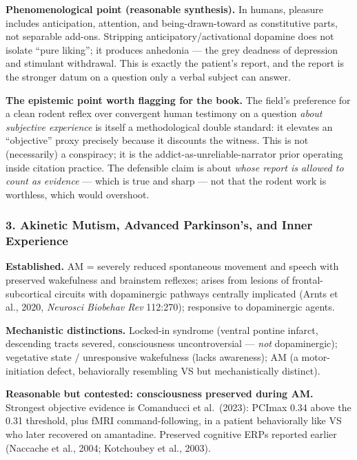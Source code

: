 \textbf{Phenomenological point (reasonable synthesis).} In humans, pleasure includes anticipation, attention, and being-drawn-toward as constitutive parts, not separable add-ons. Stripping anticipatory/activational dopamine does not isolate ``pure liking''; it produces anhedonia --- the grey deadness of depression and stimulant withdrawal. This is exactly the patient's report, and the report is the stronger datum on a question only a verbal subject can answer.

\textbf{The epistemic point worth flagging for the book.} The field's preference for a clean rodent reflex over convergent human testimony on a question \emph{about subjective experience} is itself a methodological double standard: it elevates an ``objective'' proxy precisely because it discounts the witness. This is not (necessarily) a conspiracy; it is the addict-as-unreliable-narrator prior operating inside citation practice. The defensible claim is about \emph{whose report is allowed to count as evidence} --- which is true and sharp --- not that the rodent work is worthless, which would overshoot.

\subsubsection{3. Akinetic Mutism, Advanced Parkinson's, and Inner Experience}\label{02_dopamine_action-akinetic-mutism-advanced-parkinsons-and-inner-experience}

\textbf{Established.} AM = severely reduced spontaneous movement and speech with preserved wakefulness and brainstem reflexes; arises from lesions of frontal-subcortical circuits with dopaminergic pathways centrally implicated (Arnts et al., 2020, \emph{Neurosci Biobehav Rev} 112:270); responsive to dopaminergic agents.

\textbf{Mechanistic distinctions.} Locked-in syndrome (ventral pontine infarct, descending tracts severed, consciousness uncontroversial --- \emph{not} dopaminergic); vegetative state / unresponsive wakefulness (lacks awareness); AM (a motor-initiation defect, behaviorally resembling VS but mechanistically distinct).

\textbf{Reasonable but contested: consciousness preserved during AM.} Strongest objective evidence is Comanducci et al.~(2023): PCImax 0.34 above the 0.31 threshold, plus fMRI command-following, in a patient behaviorally like VS who later recovered on amantadine. Preserved cognitive ERPs reported earlier (Naccache et al., 2004; Kotchoubey et al., 2003).

